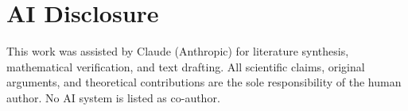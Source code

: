 \documentclass[12pt,a4paper]{article}
\theoremstyle{remark}
\begin{document}
\section*{AI Disclosure}
This work was assisted by Claude (Anthropic) for literature synthesis, mathematical verification, and text drafting. All scientific claims, original arguments, and theoretical contributions are the sole responsibility of the human author. No AI system is listed as co-author.
\end{document}
